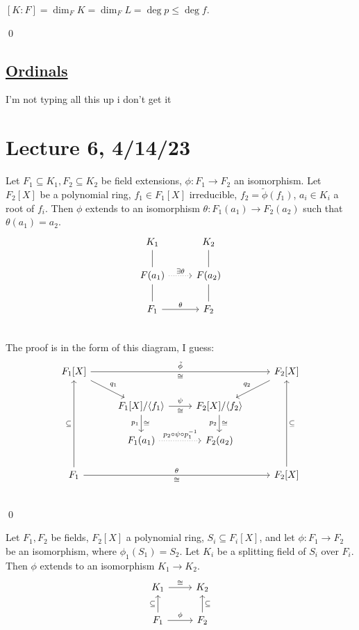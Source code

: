 \documentclass[x11names,reqno,14pt]{extarticle}
\begin{document}
$[K:F] = \dim_FK = \dim_FL = \deg p \leq \deg f$. 

\qed

\subsection*{\underline{Ordinals}}

I'm not typing all this up i don't get it











\section*{Lecture 6, 4/14/23}


Let $F_1\subseteq K_1, F_2\subseteq K_2$ be field extensions, $\phi:F_1\to F_2$ an isomorphism. Let $F_2[X]$ be a polynomial ring, $f_1 \in F_1[X]$ irreducible, $f_2 = \tilde{\phi}(f_1)$, $a_i \in K_i$ a root of $f_i$. Then $\phi$ extends to an isomorphism $\theta:F_1(a_1) \to F_2(a_2)$ such that $\theta(a_1) = a_2$. 
\[
\begin{tikzcd}
K_1 \ar[d, dash] & K_2 \ar[d, dash] \\
F(a_1) \ar[d,dash]\ar[r, dotted, "\exists\theta"] & \ar[d,dash]F(a_2) \\
F_1 \ar[r, "\theta"] & F_2 \\
\end{tikzcd}
\]
The proof is in the form of this diagram, I guess:
\proof
\[
\begin{tikzcd}
F_1[X]\ar[dr, "q_1"] \ar[rrr, "\tilde{\phi}", "\cong"'] &  &  & F_2[X] \ar[dl, "q_2"']\\
 & F_1[X]/\langle f_1 \rangle \ar[d, "p_1"', "\cong"] \ar[r, "\psi", "\cong"'] & F_2[X]/\langle f_2 \rangle \ar[d, "p_2"', "\cong"] &  \\
 & F_1(a_1) \ar[r, "p_2 \circ \psi \circ p_1^{-1}", dotted] & F_2(a_2) &  \\
F_1 \ar[uuu, "\subseteq"] \ar[rrr, "\theta", "\cong"'] &  & & F_2[X] \ar[uuu, "\subseteq"'] \\
\end{tikzcd}
\]
\qed

\thm Let $F_1, F_2$ be fields, $F_2[X]$ a polynomial ring, $S_i \subseteq F_i[X]$, and let $\phi:F_1\to F_2$ be an isomorphism, where $\phi_1(S_1) = S_2$. Let $K_i$ be a splitting field of $S_i$ over $F_i$. Then $\phi$ extends to an isomorphism $K_1 \to K_2$. 
\[
\begin{tikzcd}
K_1 \ar[r, "\cong"] & K_2 \\
F_1 \ar[u, "\subseteq"] \ar[r, "\phi"] & F_2 \ar[u, "\subseteq"']
\end{tikzcd}
\]
\end{document}
